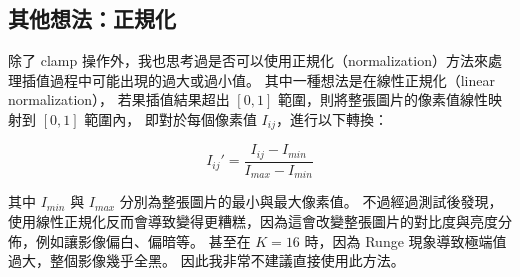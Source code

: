 \documentclass[a4paper,  10pt, oneside, fleqn]{article}
\begin{document}
\subsection*{其他想法：正規化}

除了 clamp 操作外，我也思考過是否可以使用正規化（normalization）方法來處理插值過程中可能出現的過大或過小值。
其中一種想法是在線性正規化（linear normalization），
若果插值結果超出 $[0, 1]$ 範圍，則將整張圖片的像素值線性映射到 $[0, 1]$ 範圍內，
即對於每個像素值 $I_{ij}$，進行以下轉換：

\begin{equation}
    I_{ij}' = \frac{I_{ij} - I_{min}}{I_{max} - I_{min}}
\end{equation}

其中 $I_{min}$ 與 $I_{max}$ 分別為整張圖片的最小與最大像素值。
不過經過測試後發現，使用線性正規化反而會導致變得更糟糕，因為這會改變整張圖片的對比度與亮度分佈，例如讓影像偏白、偏暗等。
甚至在 $K = 16$ 時，因為 Runge 現象導致極端值過大，整個影像幾乎全黑。
因此我非常不建議直接使用此方法。
\end{document}

